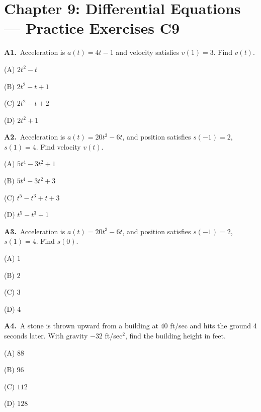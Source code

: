 \documentclass[11pt]{article}
\begin{document}
\section*{Chapter 9: Differential Equations --- Practice Exercises C9}

\bigskip\noindent\textbf{A1.}\ Acceleration is $a(t)=4t-1$ and velocity satisfies $v(1)=3$. Find $v(t)$.
\begin{list}{}{\setlength{\leftmargin}{3em}\setlength{\labelwidth}{2.5em}\setlength{\itemsep}{0pt}\setlength{\topsep}{2pt}}
\item[(A)] $2t^2-t$
\item[(B)] $2t^2-t+1$
\item[(C)] $2t^2-t+2$
\item[(D)] $2t^2+1$
\end{list}

\bigskip\noindent\textbf{A2.}\ Acceleration is $a(t)=20t^3-6t$, and position satisfies $s(-1)=2$, $s(1)=4$. Find velocity $v(t)$.
\begin{list}{}{\setlength{\leftmargin}{3em}\setlength{\labelwidth}{2.5em}\setlength{\itemsep}{0pt}\setlength{\topsep}{2pt}}
\item[(A)] $5t^4-3t^2+1$
\item[(B)] $5t^4-3t^2+3$
\item[(C)] $t^5-t^3+t+3$
\item[(D)] $t^5-t^3+1$
\end{list}

\bigskip\noindent\textbf{A3.}\ Acceleration is $a(t)=20t^3-6t$, and position satisfies $s(-1)=2$, $s(1)=4$. Find $s(0)$.
\begin{list}{}{\setlength{\leftmargin}{3em}\setlength{\labelwidth}{2.5em}\setlength{\itemsep}{0pt}\setlength{\topsep}{2pt}}
\item[(A)] $1$
\item[(B)] $2$
\item[(C)] $3$
\item[(D)] $4$
\end{list}

\bigskip\noindent\textbf{A4.}\ A stone is thrown upward from a building at 40 ft/sec and hits the ground 4 seconds later. With gravity $-32$ ft/sec$^2$, find the building height in feet.
\begin{list}{}{\setlength{\leftmargin}{3em}\setlength{\labelwidth}{2.5em}\setlength{\itemsep}{0pt}\setlength{\topsep}{2pt}}
\item[(A)] $88$
\item[(B)] $96$
\item[(C)] $112$
\item[(D)] $128$
\end{list}
\end{document}
